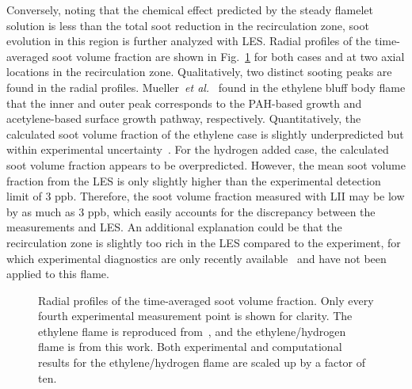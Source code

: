 Conversely, noting that the chemical effect predicted by the steady flamelet solution is less than the total soot reduction in the recirculation zone, soot evolution in this region is further analyzed with LES.  Radial profiles of the time-averaged soot volume fraction are shown in Fig.~\ref{fig:fv_radial} for both cases and at two axial locations in the recirculation zone.  Qualitatively, two distinct sooting peaks are found in the radial profiles.  Mueller~\emph{et al.}~\cite{mueller13} found in the ethylene bluff body flame that the inner and outer peak corresponds to the PAH-based growth and acetylene-based surface growth pathway, respectively.  Quantitatively, the calculated soot volume fraction of the ethylene case is slightly underpredicted but within experimental uncertainty~\cite{mueller13}.  For the hydrogen added case, the calculated soot volume fraction appears to be overpredicted.  However, the mean soot volume fraction from the LES is only slightly higher than the experimental detection limit of 3 ppb.  Therefore, the soot volume fraction measured with LII may be low by as much as 3 ppb, which easily accounts for the discrepancy between the measurements and LES.  An additional explanation could be that the recirculation zone is slightly too rich in the LES compared to the experiment, for which experimental diagnostics are only recently available~\cite{buxton13} and have not been applied to this flame.

\begin{figure}[t]
  \centering
  \scriptsize
  \resizebox{0.7\textwidth}{!}{}
  \resizebox{0.7\textwidth}{!}{}
  \normalsize
  \caption{Radial profiles of the time-averaged soot volume fraction.  Only every fourth experimental measurement point is shown for clarity.  The ethylene flame is reproduced from~\cite{mueller13}, and the ethylene/hydrogen flame is from this work.  Both experimental and computational results for the ethylene/hydrogen flame are scaled up by a factor of ten.}
  \label{fig:fv_radial}
\end{figure}

